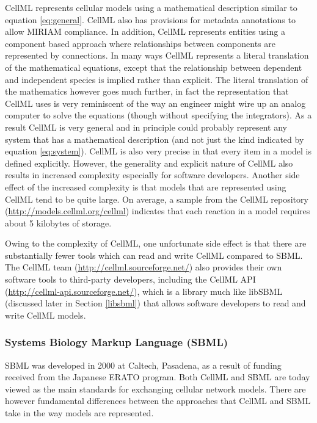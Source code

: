 \documentclass[]{article}
\begin{document}
CellML \autocite{LloydCellML2004} represents cellular models using a
mathematical description similar to equation \ref{eq:general}. CellML
also has provisions for metadata annotations to allow MIRIAM compliance.
In addition, CellML represents entities using a component based approach
where relationships between components are represented by connections.
In many ways CellML represents a literal translation of the mathematical
equations, except that the relationship between dependent and
independent species is implied rather than explicit. The literal
translation of the mathematics however goes much further, in fact the
representation that CellML uses is very reminiscent of the way an
engineer might wire up an analog computer to solve the equations (though
without specifying the integrators). As a result CellML is very general
and in principle could probably represent any system that has a
mathematical description (and not just the kind indicated by equation
\ref{eq:system}). CellML is also very precise in that every item in a
model is defined explicitly. However, the generality and explicit nature
of CellML also results in increased complexity especially for software
developers. Another side effect of the increased complexity is that
models that are represented using CellML tend to be quite large. On
average, a sample from the CellML repository
(\url{http://models.cellml.org/cellml}) indicates that each reaction in
a model requires about 5 kilobytes of storage.

Owing to the complexity of CellML, one unfortunate side effect is that
there are substantially fewer tools which can read and write CellML
compared to SBML. The CellML team (\url{http://cellml.sourceforge.net/})
also provides their own software tools to third-party developers,
including the CellML API (\url{http://cellml-api.sourceforge.net/}),
which is a library much like libSBML (discussed later in Section
\ref{libsbml}) that allows software developers to read and write CellML
models.

\subsubsection{Systems Biology Markup Language (SBML)}

SBML was developed in 2000 at Caltech, Pasadena, as a result of funding
received from the Japanese ERATO program. Both CellML and SBML are today
viewed as the main standards for exchanging cellular network models.
There are however fundamental differences between the approaches that
CellML and SBML take in the way models are represented.
\end{document}
